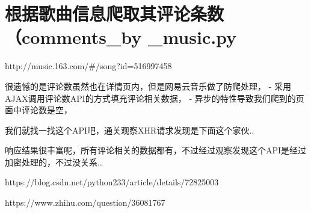 \documentclass[11pt]{ctexart}
\begin{document}
    \hypertarget{ux6839ux636eux6b4cux66f2ux4fe1ux606fux722cux53d6ux5176ux8bc4ux8bbaux6761ux6570comments_by-_music.py}{%
\section{根据歌曲信息爬取其评论条数（comments\_by
\_music.py}\label{ux6839ux636eux6b4cux66f2ux4fe1ux606fux722cux53d6ux5176ux8bc4ux8bbaux6761ux6570comments_by-_music.py}}

    http://music.163.com/\#/song?id=516997458

很遗憾的是评论数虽然也在详情页内，但是网易云音乐做了防爬处理， -
采用AJAX调用评论数API的方式填充评论相关数据， -
异步的特性导致我们爬到的页面中评论数是空，

我们就找一找这个API吧，通关观察XHR请求发现是下面这个家伙..

响应结果很丰富呢，所有评论相关的数据都有，不过经过观察发现这个API是经过加密处理的，不过没关系\ldots{}

https://blog.csdn.net/python233/article/details/72825003

https://www.zhihu.com/question/36081767
\end{document}
